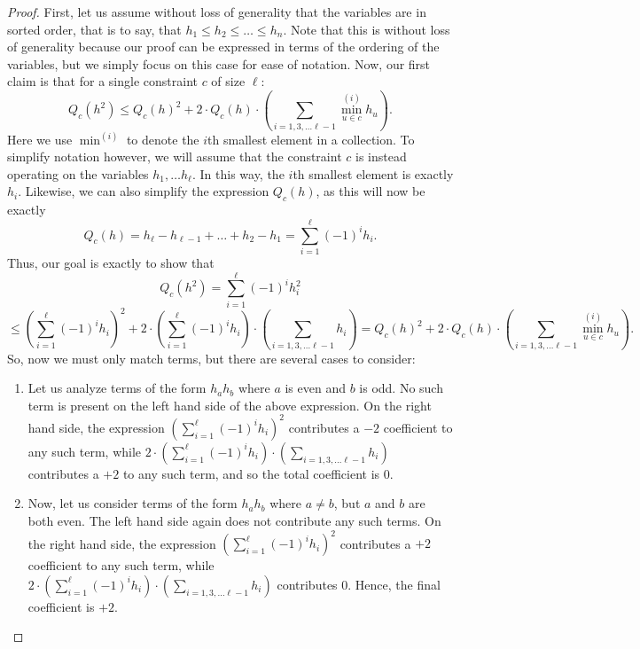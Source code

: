 \documentclass[11pt]{article}
\theoremstyle{definition}
\begin{document}
\begin{proof}
    First, let us assume without loss of generality that the variables are in sorted order, that is to say, that $h_1 \leq h_2 \leq \dots \leq h_n$. Note that this is without loss of generality because our proof can be expressed in terms of the ordering of the variables, but we simply focus on this case for ease of notation. Now, our first claim is that for a single constraint $c$ of size $\ell$:
    \[
Q_c(h^2) \leq Q_c(h)^2 + 2 \cdot Q_c(h) \cdot \left ( \sum_{i = 1, 3, \dots \ell -1} \min^{(i)}_{u \in c} h_u \right ).
    \]
    Here we use $\min^{(i)}$ to denote the $i$th smallest element in a collection. To simplify notation however, we will assume that the constraint $c$ is instead operating on the variables $h_1, \dots h_{\ell}$. In this way, the $i$th smallest element is exactly $h_i$. Likewise, we can also simplify the expression $Q_c(h)$, as this will now be exactly 
    \[
    Q_c(h) = h_{\ell} - h_{\ell-1} + \dots + h_2 - h_1 = \sum_{i = 1}^{\ell} (-1)^i h_i.
    \]
    Thus, our goal is exactly to show that 
    \[
    Q_c(h^2) = \sum_{i = 1}^{\ell} (-1)^i h_i^2 \]
    \[
    \leq \left ( \sum_{i = 1}^{\ell} (-1)^i h_i \right )^2 + 2 \cdot \left ( \sum_{i = 1}^{\ell} (-1)^i h_i \right ) \cdot \left ( \sum_{i = 1, 3, \dots \ell-1} h_i \right ) =  Q_c(h)^2 + 2 \cdot Q_c(h) \cdot \left ( \sum_{i = 1, 3, \dots \ell -1} \min^{(i)}_{u \in c} h_u \right ) .
    \]
    So, now we must only match terms, but there are several cases to consider:
    \begin{enumerate}
        \item Let us analyze terms of the form $h_ah_b$ where $a$ is even and $b$ is odd. No such term is present on the left hand side of the above expression. On the right hand side, the expression $\left( \sum_{i = 1}^{\ell} (-1)^i h_i \right )^2$ contributes a $-2$ coefficient to any such term, while $2 \cdot \left ( \sum_{i = 1}^{\ell} (-1)^i h_i \right ) \cdot \left ( \sum_{i = 1, 3, \dots \ell-1} h_i \right )$ contributes a $+2$ to any such term, and so the total coefficient is $0$. 
        \item Now, let us consider terms of the form  $h_ah_b$ where $a \neq b$, but $a$ and $b$ are both even. The left hand side again does not contribute any such terms. On the right hand side, the expression $\left( \sum_{i = 1}^{\ell} (-1)^i h_i \right )^2$ contributes a $+2$ coefficient to any such term, while $2 \cdot \left ( \sum_{i = 1}^{\ell} (-1)^i h_i \right ) \cdot \left ( \sum_{i = 1, 3, \dots \ell-1} h_i \right )$ contributes $0$. Hence, the final coefficient is $+2$.

\end{enumerate}
\end{proof}
\end{document}
